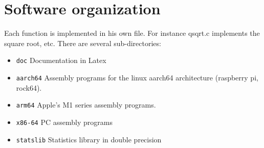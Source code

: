\documentclass[10pt,a4paper,x11names]{memoir} %
\begin{document}
\section{Software organization}
Each function is implemented in  his own file. For instance qsqrt.c implements the square root, etc. 
There are several sub-directories:
\begin{itemize}
	\item \texttt{doc} Documentation in Latex
	\item \texttt{aarch64} Assembly programs for the linux aarch64 architecture (raspberry pi, rock64).
	\item \texttt{arm64} Apple's M1 series assembly programs.
	\item \texttt{x86-64} PC assembly programs
	\item \texttt{statslib} Statistics library in double precision
\end{itemize}
\end{document}
